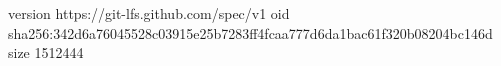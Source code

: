 version https://git-lfs.github.com/spec/v1
oid sha256:342d6a76045528c03915e25b7283ff4fcaa777d6da1bac61f320b08204bc146d
size 1512444
